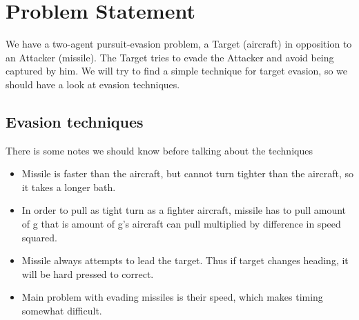 \section{Problem Statement}
We have a two-agent pursuit-evasion problem, a Target (aircraft) in opposition to an Attacker (missile). The Target tries to evade the Attacker and avoid being captured by him. We will try to find a simple technique for target evasion, so we should have a look at evasion techniques.

\subsection{Evasion techniques}
There is some notes we should know before talking about the techniques 
\begin{itemize}
	\item Missile is faster than the aircraft, but cannot turn tighter than the aircraft, so it takes a longer bath.
	\item In order to pull as tight turn as a fighter aircraft, missile has to pull amount of g that is amount of g’s aircraft can pull multiplied by difference in speed squared.
	\item Missile always attempts to lead the target. Thus if target changes heading, it will be hard pressed to correct.
	\item  Main problem with evading missiles is their speed, which makes timing somewhat difficult.
\end{itemize}

